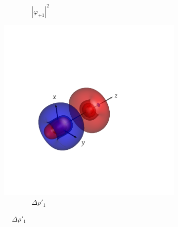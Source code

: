 \documentclass[journal=inoraj,manuscript=article]{achemso}
\begin{document}
\begin{figure}[!h]
\begin{subfigure}[t]{0.32\textwidth}
        \caption*{\ \ \ \ \ \ \ \ $|\varphi_{+1}|^2$} 
    \end{subfigure}
    \hfill
    \begin{subfigure}[t]{0.32\textwidth}
        \centering
        \includegraphics[width=\linewidth]{./AuFl+/pair1.png} 
        \caption*{\ \ \ \ \ \ \ \ $\Delta \rho'_1$} 
    \end{subfigure}


\end{figure}
\end{document}
